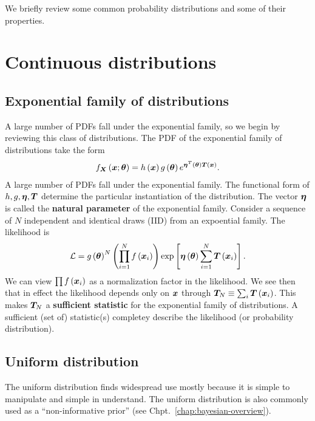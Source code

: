 We briefly review some common probability distributions and some of their properties.

\section{Continuous distributions}
\subsection{Exponential family of distributions}
A large number of PDFs fall under the exponential family, so we
begin by reviewing this class of distributions. 
The PDF of the exponential family of distributions take the form
\begin{align}
    f_{{\bm X}}\left({\bm x};{\bm \theta}\right)
    =
    h\left({\bm x}\right)
    g\left({\bm \theta}\right)
    e^{{\bm \eta}^T\left({\bm \theta}\right){\bm T}\left({\bm x}\right)}
    .
\end{align}
A large number of PDFs fall under the exponential family. 
The functional form of $h,g,{\bm \eta},{\bm T}$ determine the particular
instantiation of the distribution.
The vector ${\bm \eta}$ is called the \textbf{natural parameter} of the exponential family.
Consider a sequence of $N$ independent and identical draws (IID) from 
an expoential family.
The likelihood is
\begin{align}
    \mathcal{L}
    =
    g\left({\bm \theta}\right)^N
    \left(\prod_{i=1}^N f\left({\bm x}_i\right)\right)
    \mathrm{exp}\left[
        {\bm \eta}\left({\bm \theta}\right)
        \sum_{i=1}^N {\bm T}\left({\bm x}_i\right)
    \right]
    .
\end{align}
We can view $\prod f\left({\bm x}_i\right)$ as a normalization factor in the likelihood.
We see then that in effect the likelihood depends only on ${\bm x}$
through ${\bm T}_N \equiv \sum_i {\bm T}\left({\bm x}_i\right)$.
This makes ${\bm T}_N$ a \textbf{sufficient statistic} for the exponential
family of distributions.
A sufficient (set of) statistic(s) completey describe the likelihood
(or probability distribution).
\subsection{Uniform distribution}
The uniform distribution finds widespread use mostly because it is
simple to manipulate and simple in understand.
The uniform distribution is also commonly used as a ``non-informative prior''
(see Chpt.~\ref{chap:bayesian-overview}). 

